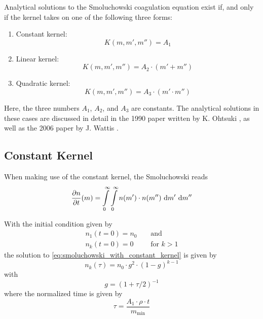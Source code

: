     Analytical solutions to the Smoluchowski coagulation equation exist if, and only if the kernel
    takes on one of the following three forms:
    \begin{enumerate}
        \item Constant kernel:
            \begin{equation}
                K(m, m', m'') = A_1
            \end{equation}
        \item Linear kernel:
            \begin{equation}
                K(m, m', m'') = A_2 \cdot (m' + m'')
            \end{equation}
        \item Quadratic kernel:
            \begin{equation}
                K(m, m', m'') = A_3 \cdot (m' \cdot m'')
            \end{equation}
    \end{enumerate}

    Here, the three numbers $A_1$, $A_2$, and $A_3$ are constants. 
    The analytical solutions in these cases are discussed in detail 
    in the 1990 paper written by K. Ohtsuki \cite{ohtsuki_1990}, as well as
    the 2006 paper by J. Wattis \cite{wattis_2006}.

    \subsection{Constant Kernel}


    When making use of the constant kernel, the Smoluchowski reads
    \begin{equation}
        \frac{\partial n}{\partial t}(m)
            = 
                \int\limits_0^\infty \int\limits_0^\infty
                n(m') \cdot n(m'')
                \ \text{d} m' \ \text{d} m''
        \label{eq:smoluchowski_with_constant_kernel}
    \end{equation}
    
    With the initial condition given by 
    \begin{align}
        n_1(t=0) = n_0 
        \ \ \ \ \ &\text{and} \\
        n_k(t=0) = 0 
        \ \ \ \ \ &\text{for } k>1
    \end{align}
    the solution to \cref{eq:smoluchowski_with_constant_kernel} is 
    given by \cite{smoluchowski_1916} \cite{ohtsuki_2017}
    \begin{equation}
        n_k(\tau) = n_0 \cdot g^2 \cdot (1-g)^{k-1}
    \end{equation}
    with 
    \begin{equation}
        g = (1+\tau/2)^{-1}
    \end{equation}
    where the normalized time is given by 
    \begin{equation}
        \tau = \frac{A_1 \cdot \rho \cdot t}{m_\text{min}}
    \end{equation}

